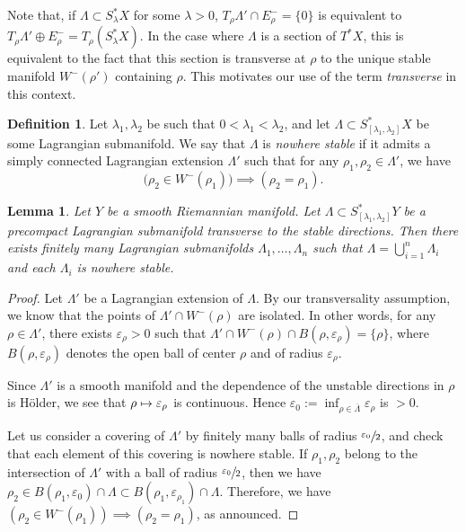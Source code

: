 \documentclass[10pt]{amsart}
\newcommand\mto{\mathchoice{\longmapsto}{\mapsto}{\mapsto}{\mapsto}}
\theoremstyle{plain}
\newtheorem{lemma}[theorem]{Lemma}
\theoremstyle{definition}
\newtheorem{definition}[theorem]{Definition}
\begin{document}
Note that, if $\Lambda\subset S^*_\lambda X$ for some $\lambda>0$, $T_\rho\Lambda'\cap E^-_\rho=\{0\}$ is equivalent to $T_\rho\Lambda'\oplus E^-_\rho=T_\rho(S^*_\lambda X)$. In the case where $\Lambda$ is a section of $T^*X$, this is equivalent to the fact that this section is transverse at $\rho$ to the unique stable manifold $W^-(\rho')$ containing $\rho$. This motivates our use of the term \emph{transverse} in this context.

\begin{definition}
Let $\lambda_1,\lambda_2$ be such that $0<\lambda_1<\lambda_2$, and let $\Lambda \subset S^*_{[\lambda_1,\lambda_2]}X$ be some Lagrangian submanifold.
We say that $\Lambda$ is \emph{nowhere stable} if it admits a simply connected Lagrangian extension $\Lambda'$ such that for any $\rho_1, \rho_2\in \Lambda'$, we have
\begin{equation}\label{eq:DefNonStable}
\bigl(\rho_2 \in W^{-}(\rho_1) \bigr) \implies(\rho_2=\rho_1).
\end{equation}
\end{definition}

\begin{lemma}\label{lem:PetitesLag}
Let $Y$ be a smooth Riemannian manifold. Let $\Lambda \subset S^*_{[\lambda_1,\lambda_2]}Y$ be a precompact Lagrangian submanifold transverse to the stable directions. Then there exists finitely many Lagrangian submanifolds $\Lambda_1,\dots, \Lambda_n$ such that $\Lambda= \bigcup_{i=1}^n \Lambda_i$ and each $\Lambda_i$ is nowhere stable.
\end{lemma}

\begin{proof}
Let $\Lambda'$ be a Lagrangian extension of $\Lambda$. By our transversality assumption, we know that the points of $\Lambda'\cap W^-(\rho)$ are isolated. In other words, for any $\rho\in \Lambda'$, there exists $\varepsilon_\rho>0$ such that $\Lambda'\cap W^-(\rho)\cap B(\rho, \varepsilon_\rho) = \{\rho\}$, where $B(\rho, \varepsilon_\rho)$ denotes the open ball of center $\rho$ and of radius $\varepsilon_\rho$.

Since $\Lambda'$ is a smooth manifold and the dependence of the unstable directions in $\rho$ is Hölder, we see that $\rho\mto \varepsilon_\rho$ is continuous. Hence $\varepsilon_0:= \inf_{\rho\in \overline{\Lambda}} \varepsilon_\rho$ is $>0$.

Let us consider a covering of $\Lambda'$ by finitely many balls of radius $\sfrac{\varepsilon_0}{2}$, and check that each element of this covering is nowhere stable. If $\rho_1, \rho_2$ belong to the intersection of $\Lambda'$ with a ball of radius $\sfrac{\varepsilon_0}{2}$, then we have $\rho_2\in B(\rho_1, \varepsilon_0) \cap \Lambda\subset B(\rho_1, \varepsilon_{\rho_1}) \cap \Lambda$. Therefore, we have $(\rho_2\in W^-(\rho_1)) \implies (\rho_2=\rho_1)$, as announced.
\end{proof}
\end{document}
